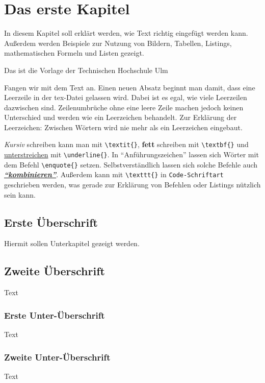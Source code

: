 \chapter{Das erste Kapitel}

In diesem Kapitel soll erklärt werden, wie Text richtig eingefügt werden kann. Außerdem werden Beispiele zur Nutzung von Bildern, Tabellen, Listings, mathematischen Formeln und Listen gezeigt.

Das ist die Vorlage der Technischen Hochschule Ulm



Fangen wir mit dem Text an. Einen neuen Absatz beginnt man damit, dass eine Leerzeile in der tex-Datei gelassen wird. Dabei ist es egal, wie viele Leerzeilen dazwischen sind.
Zeilenumbrüche ohne eine leere Zeile machen jedoch keinen Unterschied und werden wie ein Leerzeichen behandelt. Zur Erklärung der     Leerzeichen:   Zwischen Wörtern wird nie mehr als ein    Leerzeichen    eingebaut.

\textit{Kursiv} schreiben kann man mit \texttt{\textbackslash{}textit\{\}}, \textbf{fett} schreiben mit \texttt{\textbackslash{}textbf\{\}} und \underline{unterstreichen} mit \texttt{\textbackslash{}underline\{\}}. In \enquote{Anführungszeichen} lassen sich Wörter mit dem Befehl \texttt{\textbackslash{}enquote\{\}} setzen. Selbstverständlich lassen sich solche Befehle auch \textit{\textbf{\underline{\enquote{kombinieren}}}}. Außerdem kann mit \texttt{\textbackslash{}texttt\{\}} in \texttt{Code-Schriftart} geschrieben werden, was gerade zur Erklärung von Befehlen oder Listings nützlich sein kann.

\section{Erste Überschrift}
Hiermit sollen Unterkapitel gezeigt werden.

\section{Zweite Überschrift}
Text\cite{Lieb2004}

\subsection{Erste Unter-Überschrift}
Text

\subsection{Zweite Unter-Überschrift}
Text

